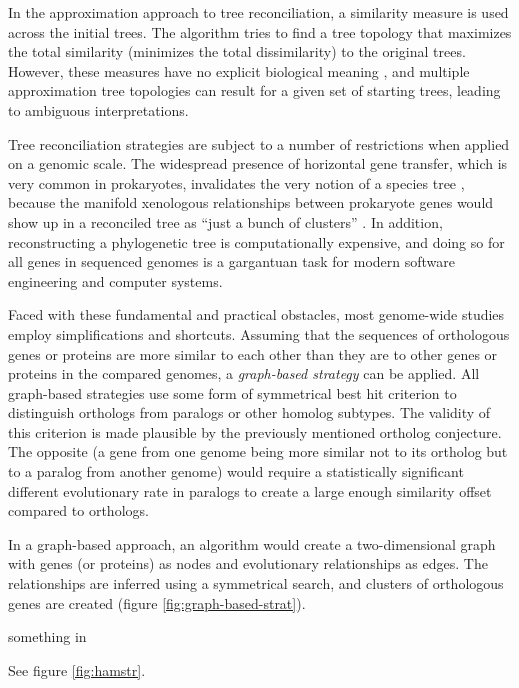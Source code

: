 

In the approximation approach to tree reconciliation, a similarity measure is
used across the initial trees. The algorithm tries to find a tree topology that
maximizes the total similarity (minimizes the total dissimilarity) to the
original trees. However, these measures have no explicit biological meaning
\citep{mirkin1995}, and multiple approximation tree topologies can result for a
given set of starting trees, leading to ambiguous interpretations. 

Tree reconciliation strategies are subject to a number of restrictions when
applied on a genomic scale. The widespread presence of horizontal gene
transfer, which is very common in prokaryotes, invalidates the very notion of a
species tree \citet{doolittle2000}, because the manifold xenologous
relationships between prokaryote genes would show up in a reconciled tree as
``just a bunch of clusters'' . In addition, reconstructing a
phylogenetic tree is computationally expensive, and doing so for all genes in
sequenced genomes is a gargantuan task for modern software engineering and
computer systems.

Faced with these fundamental and practical obstacles, most genome-wide
studies employ simplifications and shortcuts. Assuming that the sequences of
orthologous genes or proteins are more similar to each other than they are to
other genes or proteins in the compared genomes, a \emph{graph-based strategy}
can be applied. All graph-based strategies use some form of symmetrical best hit
criterion to distinguish orthologs from paralogs or other homolog subtypes. The
validity of this criterion is made plausible by the previously mentioned
ortholog conjecture. The opposite (a gene from one genome being more similar not
to its ortholog but to a paralog from another genome) would require a
statistically significant different evolutionary rate in paralogs to create a
large enough similarity offset compared to orthologs.

In a graph-based approach, an algorithm would create a two-dimensional graph
with genes (or proteins) as nodes and evolutionary relationships as edges. The
relationships are inferred using a symmetrical search, and clusters of
orthologous genes are created (figure \ref{fig:graph-based-strat}). 



something in \citet{page1997}

See figure \ref{fig:hamstr}.
